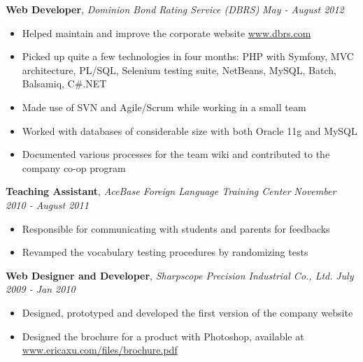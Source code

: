 \documentclass[9pt]{article}
\newenvironment{changemargin}[2]{%
  \begin{list}{}{%
    \setlength{\topsep}{0pt}%
    \setlength{\leftmargin}{#1}%
    \setlength{\rightmargin}{#2}%
    \setlength{\listparindent}{\parindent}%
    \setlength{\itemindent}{\parindent}%
    \setlength{\parsep}{\parskip}%
  }%
  \item[]}{\end{list}
}
\newenvironment{body} {
	\vspace*{-16pt}
	\begin{changemargin}{-0.25in}{-0.5in}
  }	
	{\end{changemargin}
}
\begin{document}
\begin{body}
	\vspace{14pt}
	\textbf{Web Developer}, \emph{Dominion Bond Rating Service  (DBRS)} \hfill \emph{May - August 2012 }\\
	\vspace*{-4pt}
	\begin{itemize} \itemsep -0pt  %
		\item Helped maintain and improve the corporate website \url{www.dbrs.com}
		\item Picked up quite a few technologies in four months: PHP with Symfony, MVC architecture, PL/SQL, Selenium testing suite, NetBeans, MySQL, Batch, Balsamiq, C\#.NET
		\item Made use of SVN and Agile/Scrum while working in a small team
		\item Worked with databases of considerable size with both Oracle 11g and MySQL
		\item Documented various processes for the team wiki and contributed to the company co-op program
		
	\end{itemize}

	\textbf{Teaching Assistant}, \emph{AceBase Foreign Language Training Center} \hfill \emph{November 2010 - August 2011}\\
	\vspace*{-4pt}
	\begin{itemize} \itemsep -0pt  %
		\item Responsible for communicating with students and parents for feedbacks
		\item Revamped the vocabulary testing procedures by randomizing tests
	\end{itemize}

	\textbf {Web Designer and Developer}, \emph{Sharpscope Precision Industrial Co., Ltd.} \hfill \emph{July 2009 - Jan 2010}
	\vspace*{-4pt}
	\begin{itemize} \itemsep -0pt
		\item Designed, prototyped and developed the first version of the company website
		\item Designed the brochure for a product with Photoshop, available at \url{www.ericaxu.com/files/brochure.pdf}
	\end{itemize}
\end{body}

\smallskip
\end{document}
